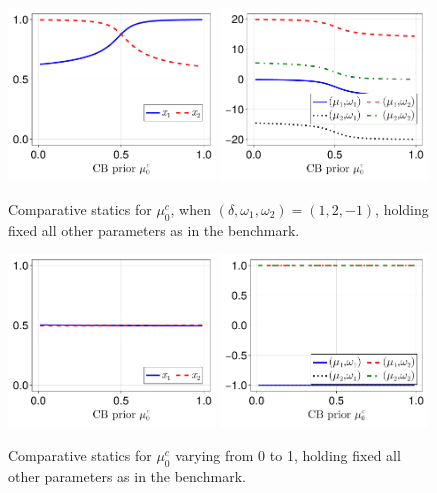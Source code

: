 \documentclass[12pt,a4paper]{article}
\begin{document}
\begin{figure}[H]
\centering
\includegraphics[width=0.49\textwidth]{figures/V8/γ_10/fig_optimal_π_across_μ_0_c_ω_1_2_ω_2_-1_δ_1.0_.pdf}
\includegraphics[width=0.49\textwidth]{figures/V8/γ_10/fig_posterior_across_μ_0_c_ω_1_2_ω_2_-1_δ_1.0_.pdf}
\caption{Comparative statics for $\mu_0^c$, when $(\delta,\omega_1,\omega_2)=(1,2,-1)$, holding fixed all other parameters as in the benchmark.}
\label{FigureA16}
\end{figure}

\begin{figure}[H]
\centering
\includegraphics[width=0.49\textwidth]{figures/V8/γ_1/fig_optimal_π_across_μ_0_c_ω_1_1_ω_2_-1_δ_0.5_.pdf}
\includegraphics[width=0.49\textwidth]{figures/V8/γ_1/fig_posterior_across_μ_0_c_ω_1_1_ω_2_-1_δ_0.5_.pdf}
\caption{Comparative statics for $\mu_0^c$ varying from 0 to 1, holding fixed all other parameters as in the benchmark.}
\label{Figure4}
\end{figure}
\end{document}
